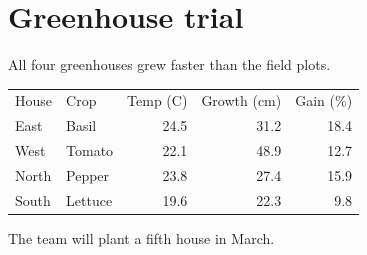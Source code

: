 \documentclass{article}
\begin{document}
\section*{Greenhouse trial}
All four greenhouses grew faster than the field plots.

\begin{center}
\begin{tabular}{llrrr}
House & Crop & Temp (C) & Growth (cm) & Gain (\%) \\
East & Basil & 24.5 & 31.2 & 18.4 \\
West & Tomato & 22.1 & 48.9 & 12.7 \\
North & Pepper & 23.8 & 27.4 & 15.9 \\
South & Lettuce & 19.6 & 22.3 & 9.8 \\
\end{tabular}
\end{center}

The team will plant a fifth house in March.
\end{document}
